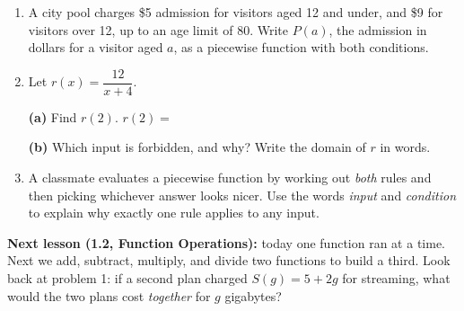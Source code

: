 \documentclass[10pt]{article}
\begin{document}
\begin{enumerate}[leftmargin=1.9em, itemsep=10pt, start=8]

\item A city pool charges \$5 admission for visitors aged 12 and under, and \$9 for visitors
      over 12, up to an age limit of 80. Write $P(a)$, the admission in dollars for a visitor
      aged $a$, as a piecewise function with both conditions.
      \writespace{2.0cm}{}

\item Let $r(x) = \dfrac{12}{x + 4}$.

      \textbf{(a)} Find $r(2)$. \quad $r(2) = $ \blank{2.2cm}

      \textbf{(b)} Which input is forbidden, and why? Write the domain of $r$ in words.
      \writespace{1.4cm}{}

\item A classmate evaluates a piecewise function by working out \emph{both} rules and then
      picking whichever answer looks nicer. Use the words \emph{input} and \emph{condition} to
      explain why exactly one rule applies to any input.
      \writespace{1.9cm}{}

\end{enumerate}

\vspace{0.1in}

\boxguard[8]
\begin{spiralbox}
\small
\textbf{Next lesson (1.2, Function Operations):} today one function ran at a time. Next we add,
subtract, multiply, and divide two functions to build a third. Look back at problem 1: if a
second plan charged $S(g) = 5 + 2g$ for streaming, what would the two plans cost \emph{together}
for $g$ gigabytes?
\end{spiralbox}
\end{document}
